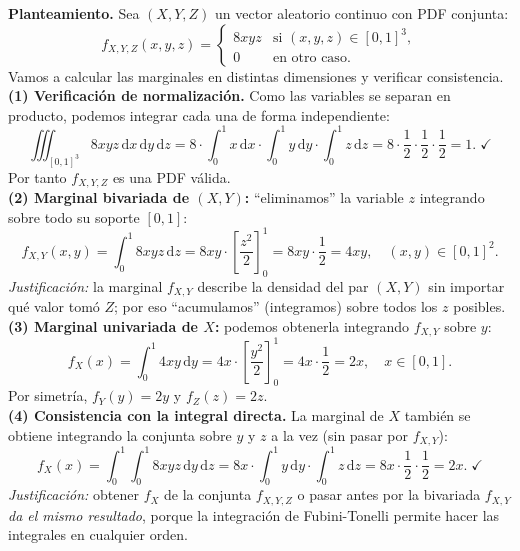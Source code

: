 \documentclass[10pt,a4paper]{article}
\numberwithin{equation}{section}
\newcounter{excount}[section]
\renewcommand{\theexcount}{\thesection.\arabic{excount}}
\newenvironment{ejemplo}[1]{%
  \refstepcounter{excount}%
  \begin{tcolorbox}[exbox, title={Ejemplo \theexcount\ \textperiodcentered\ #1}]%
}{\end{tcolorbox}}
\begin{document}
\begin{ejemplo}{Marginales de un vector trivariado continuo}
  \textbf{Planteamiento.} Sea $(X, Y, Z)$ un vector aleatorio continuo con PDF conjunta:
  \[
    f_{X,Y,Z}(x, y, z) =
    \begin{cases}
      8xyz & \text{si } (x,y,z) \in [0,1]^3, \\
      0    & \text{en otro caso}.
    \end{cases}
  \]
  Vamos a calcular las marginales en distintas dimensiones y verificar consistencia.
  \\[5pt]
  \textbf{(1) Verificaci\'on de normalizaci\'on.} Como las variables se separan en producto,
  podemos integrar cada una de forma independiente:
  \[
    \iiint_{[0,1]^3} 8xyz\,\mathrm{d}x\,\mathrm{d}y\,\mathrm{d}z
    = 8 \cdot \int_0^1 x\,\mathrm{d}x \cdot \int_0^1 y\,\mathrm{d}y \cdot \int_0^1 z\,\mathrm{d}z
    = 8 \cdot \frac{1}{2} \cdot \frac{1}{2} \cdot \frac{1}{2} = 1. \;\checkmark
  \]
  Por tanto $f_{X,Y,Z}$ es una PDF v\'alida.
  \\[5pt]
  \textbf{(2) Marginal bivariada de $(X, Y)$:} ``eliminamos'' la variable $z$ integrando
  sobre todo su soporte $[0,1]$:
  \[
    f_{X,Y}(x, y) = \int_0^1 8xyz\,\mathrm{d}z
    = 8xy \cdot \left[\frac{z^2}{2}\right]_0^1
    = 8xy \cdot \frac{1}{2} = 4xy, \quad (x,y) \in [0,1]^2.
  \]
  \emph{Justificaci\'on:} la marginal $f_{X,Y}$ describe la densidad del par $(X,Y)$ sin
  importar qu\'e valor tom\'o $Z$; por eso ``acumulamos'' (integramos) sobre todos los $z$
  posibles.
  \\[5pt]
  \textbf{(3) Marginal univariada de $X$:} podemos obtenerla integrando $f_{X,Y}$ sobre $y$:
  \[
    f_X(x) = \int_0^1 4xy\,\mathrm{d}y
    = 4x \cdot \left[\frac{y^2}{2}\right]_0^1 = 4x \cdot \frac{1}{2} = 2x,
    \quad x \in [0,1].
  \]
  Por simetr\'ia, $f_Y(y) = 2y$ y $f_Z(z) = 2z$.
  \\[5pt]
  \textbf{(4) Consistencia con la integral directa.} La marginal de $X$ tambi\'en se obtiene
  integrando la conjunta sobre $y$ y $z$ a la vez (sin pasar por $f_{X,Y}$):
  \[
    f_X(x) = \int_0^1\!\!\int_0^1 8xyz\,\mathrm{d}y\,\mathrm{d}z
    = 8x \cdot \int_0^1 y\,\mathrm{d}y \cdot \int_0^1 z\,\mathrm{d}z
    = 8x \cdot \frac{1}{2} \cdot \frac{1}{2} = 2x. \;\checkmark
  \]
  \emph{Justificaci\'on:} obtener $f_X$ de la conjunta $f_{X,Y,Z}$ o pasar antes por la
  bivariada $f_{X,Y}$ \emph{da el mismo resultado}, porque la integraci\'on de Fubini-Tonelli
  permite hacer las integrales en cualquier orden.
  \\[5pt]

\end{ejemplo}
\end{document}

